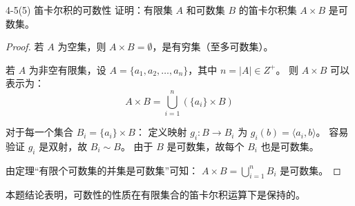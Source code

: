 \documentclass[11pt]{article}
\begin{document}
\begin{question}{4-5(5) 笛卡尔积的可数性}
  证明：有限集 $A$ 和可数集 $B$ 的笛卡尔积集 $A \times B$ 是可数集。

  \begin{answer}
    \begin{proof}
      若 $A$ 为空集，则 $A \times B = \emptyset$，是有穷集（至多可数集）。

      若 $A$ 为非空有限集，设 $A = \{a_1, a_2, \dots, a_n\}$，其中 $n = |A| \in Z^+$。
      则 $A \times B$ 可以表示为：
      $$A \times B = \bigcup_{i=1}^n (\{a_i\} \times B)$$

      对于每一个集合 $B_i = \{a_i\} \times B$：
      定义映射 $g_i: B \to B_i$ 为 $g_i(b) = \langle a_i, b \rangle$。
      容易验证 $g_i$ 是双射，故 $B_i \sim B$。
      由于 $B$ 是可数集，故每个 $B_i$ 也是可数集。

      由定理“有限个可数集的并集是可数集”可知：
      $A \times B = \bigcup_{i=1}^n B_i$ 是可数集。
    \end{proof}

    \begin{info}[注:]
      本题结论表明，可数性的性质在有限集合的笛卡尔积运算下是保持的。
    \end{info}
  \end{answer}
\end{question}
\end{document}
